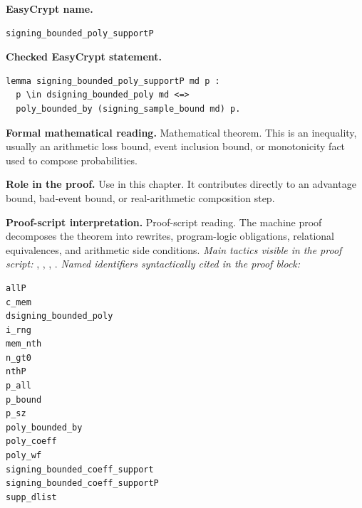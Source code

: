 \begin{formaltheorem}
\noindent\textbf{EasyCrypt name.}
\begin{lstlisting}[language=EasyCrypt,basicstyle=\ttfamily\scriptsize]
signing_bounded_poly_supportP
\end{lstlisting}
\noindent\textbf{Checked EasyCrypt statement.}
\begin{lstlisting}[language=EasyCrypt,basicstyle=\ttfamily\scriptsize]
lemma signing_bounded_poly_supportP md p :
  p \in dsigning_bounded_poly md <=>
  poly_bounded_by (signing_sample_bound md) p.
\end{lstlisting}
\noindent\textbf{Formal mathematical reading.}
Mathematical theorem. This is an inequality, usually an arithmetic loss bound, event inclusion bound, or monotonicity fact used to compose probabilities.

\noindent\textbf{Role in the proof.}
Use in this chapter. It contributes directly to an advantage bound, bad-event bound, or real-arithmetic composition step.

\noindent\textbf{Proof-script interpretation.}
Proof-script reading. The machine proof decomposes the theorem into rewrites, program-logic obligations, relational equivalences, and arithmetic side conditions.
\emph{Main tactics visible in the proof script:} , , , .
\emph{Named identifiers syntactically cited in the proof block:}
\begin{lstlisting}[language=EasyCrypt,basicstyle=\ttfamily\scriptsize]
allP
c_mem
dsigning_bounded_poly
i_rng
mem_nth
n_gt0
nthP
p_all
p_bound
p_sz
poly_bounded_by
poly_coeff
poly_wf
signing_bounded_coeff_support
signing_bounded_coeff_supportP
supp_dlist
\end{lstlisting}

\end{formaltheorem}


